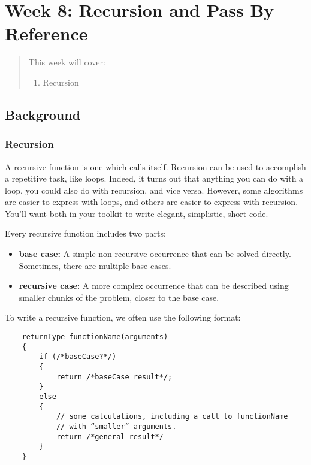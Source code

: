 \chapter*{Week 8: Recursion and Pass By Reference}
\setcounter{chapter}{8}
\setcounter{section}{0}

\begin{abstract}
This week will cover:
\begin{enumerate}
    \item Recursion
\end{enumerate}
    
\end{abstract}

\section{Background}
\subsection{Recursion}
A recursive function is one which calls itself. Recursion can be used to accomplish a repetitive task, like loops. Indeed, it turns out that anything you can do with a loop, you could also do with recursion, and vice versa. However, some algorithms are easier to express with loops, and others are easier to express with recursion. You'll want both in your toolkit to write elegant, simplistic, short code.

Every recursive function includes two parts:

\begin{itemize}
    \item \textbf{base case:} A simple non-recursive occurrence that can be solved directly. Sometimes, there are multiple base cases.
    \item \textbf{recursive case:} A more complex occurrence that can be described using smaller chunks of the problem, closer to the base case.
\end{itemize}
    
To write a recursive function, we often use the following format:

\begin{verbatim}
    returnType functionName(arguments)
    {
        if (/*baseCase?*/)
        {
            return /*baseCase result*/;
        }
        else
        {
            // some calculations, including a call to functionName
            // with “smaller” arguments.
            return /*general result*/
        }
    }
\end{verbatim}

